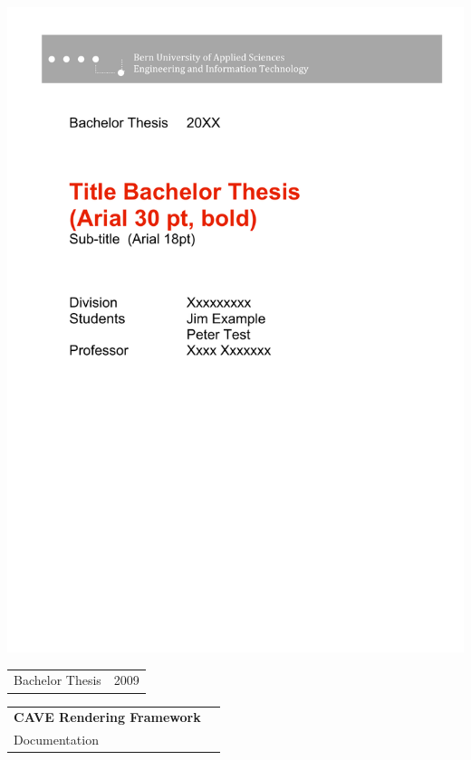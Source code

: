 \begin{titlepage}
 
\begin{flushleft}

\vspace*{-2in}\includegraphics[scale=1.1]{../tex-include/figures/title_header}

\vspace*{2in}

\begin{tabular}{p{5cm}p{8cm}}
\Large{Bachelor Thesis} & \Large{2009} \\ 
\end{tabular}

\vspace{1.8cm}
\begin{tabular}{ll}
\Huge{\bfseries CAVE Rendering Framework}\\[0.3cm]
\huge{Documentation}\\[1.8cm]
\end{tabular}


\end{flushleft}
\end{titlepage}
